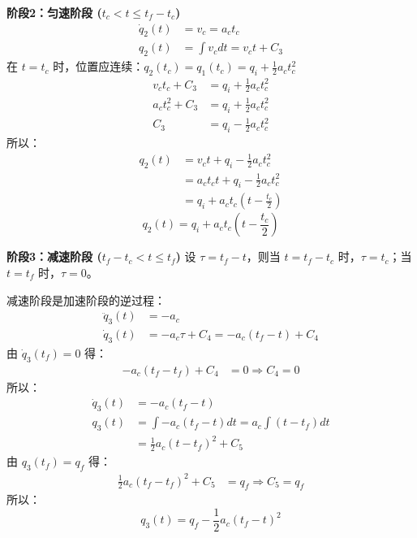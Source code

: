 \documentclass[12pt,a4paper]{article}
\begin{document}
\textbf{阶段2：匀速阶段 ($t_c < t \leq t_f - t_c$)}
\begin{align*}
    \dot{q}_2(t) &= v_c = a_c t_c \\
    q_2(t) &= \int v_c dt = v_c t + C_3
\end{align*}
在 $t = t_c$ 时，位置应连续：$q_2(t_c) = q_1(t_c) = q_i + \frac{1}{2} a_c t_c^2$
\begin{align*}
    v_c t_c + C_3 &= q_i + \frac{1}{2} a_c t_c^2 \\
    a_c t_c^2 + C_3 &= q_i + \frac{1}{2} a_c t_c^2 \\
    C_3 &= q_i - \frac{1}{2} a_c t_c^2
\end{align*}
所以：
\begin{align*}
    q_2(t) &= v_c t + q_i - \frac{1}{2} a_c t_c^2 \\
    &= a_c t_c t + q_i - \frac{1}{2} a_c t_c^2 \\
    &= q_i + a_c t_c (t - \frac{t_c}{2})
\end{align*}
\begin{equation}
\boxed{
q_2(t) = q_i + a_c t_c (t - \frac{t_c}{2})
}
\label{eq:phase2}
\end{equation}

\textbf{阶段3：减速阶段 ($t_f - t_c < t \leq t_f$)}
设 $\tau = t_f - t$，则当 $t = t_f - t_c$ 时，$\tau = t_c$；当 $t = t_f$ 时，$\tau = 0$。

减速阶段是加速阶段的逆过程：
\begin{align*}
    \ddot{q}_3(t) &= -a_c \\
    \dot{q}_3(t) &= -a_c \tau + C_4 = -a_c (t_f - t) + C_4
\end{align*}
由 $\dot{q}_3(t_f) = 0$ 得：
\begin{align*}
    -a_c (t_f - t_f) + C_4 &= 0 \Rightarrow C_4 = 0
\end{align*}
所以：
\begin{align*}
    \dot{q}_3(t) &= -a_c (t_f - t) \\
    q_3(t) &= \int -a_c (t_f - t) dt = a_c \int (t - t_f) dt \\
    &= \frac{1}{2} a_c (t - t_f)^2 + C_5
\end{align*}
由 $q_3(t_f) = q_f$ 得：
\begin{align*}
    \frac{1}{2} a_c (t_f - t_f)^2 + C_5 &= q_f \Rightarrow C_5 = q_f
\end{align*}
所以：
\begin{equation}
\boxed{
q_3(t) = q_f - \frac{1}{2} a_c (t_f - t)^2
}
\label{eq:phase3}
\end{equation}
\end{document}
